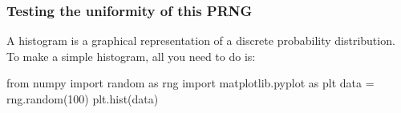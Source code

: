 \documentclass[hyperref={colorlinks=true}]{beamer}
\begin{document}

\begin{frame}[fragile]%
  \frametitle{Testing the uniformity of this PRNG}
  
  A histogram is a graphical representation of a discrete probability distribution. To make a simple histogram, all you need to do is:
  
  \begin{ucpythonblock}{}
from numpy import random as rng
import matplotlib.pyplot as plt
data = rng.random(100)  
plt.hist(data)  
  \end{ucpythonblock}

\end{frame}






%
%
%  

\end{document}
